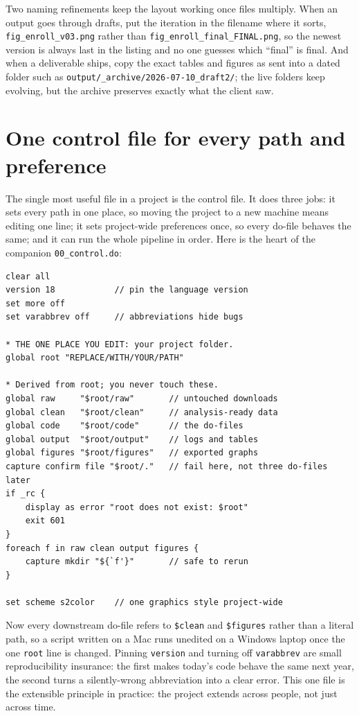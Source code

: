 \documentclass[
    a4paper,
    fontsize=10pt,
    twoside=true,
    numbers=noenddot,
]{kaobook}
\begin{document}
Two naming refinements keep the layout working once files multiply. When an output goes through drafts, put the iteration in the filename where it sorts, \texttt{fig\_enroll\_v03.png} rather than \texttt{fig\_enroll\_final\_FINAL.png}, so the newest version is always last in the listing and no one guesses which \enquote{final} is final. And when a deliverable ships, copy the exact tables and figures as sent into a dated folder such as \texttt{output/\_archive/2026-07-10\_draft2/}; the live folders keep evolving, but the archive preserves exactly what the client saw.

\section{One control file for every path and preference}\label{sec:control}
The single most useful file in a project is the control file. It does three jobs: it sets every path in one place, so moving the project to a new machine means editing one line; it sets project-wide preferences once, so every do-file behaves the same; and it can run the whole pipeline in order. Here is the heart of the companion \texttt{00\_control.do}:
\par
{\footnotesize
\begin{verbatim}
clear all
version 18            // pin the language version
set more off
set varabbrev off     // abbreviations hide bugs

* THE ONE PLACE YOU EDIT: your project folder.
global root "REPLACE/WITH/YOUR/PATH"

* Derived from root; you never touch these.
global raw     "$root/raw"       // untouched downloads
global clean   "$root/clean"     // analysis-ready data
global code    "$root/code"      // the do-files
global output  "$root/output"    // logs and tables
global figures "$root/figures"   // exported graphs
capture confirm file "$root/."   // fail here, not three do-files later
if _rc {
    display as error "root does not exist: $root"
    exit 601
}
foreach f in raw clean output figures {
    capture mkdir "${`f'}"       // safe to rerun
}

set scheme s2color    // one graphics style project-wide
\end{verbatim}
}
Now every downstream do-file refers to \texttt{\$clean} and \texttt{\$figures} rather than a literal path, so a script written on a Mac runs unedited on a Windows laptop once the one \texttt{root} line is changed. Pinning \texttt{version} and turning off \texttt{varabbrev} are small reproducibility insurance: the first makes today's code behave the same next year, the second turns a silently-wrong abbreviation into a clear error. This one file is the extensible principle in practice: the project extends across people, not just across time.
\end{document}
